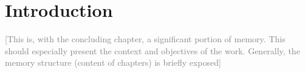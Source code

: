 \chapter{Introduction}
\label{Chap1}

\textcolor{gray}{[This is, with the concluding chapter, a significant portion of memory. This should
especially present the context and objectives of the work. Generally, the memory structure (content
of chapters) is briefly exposed]}